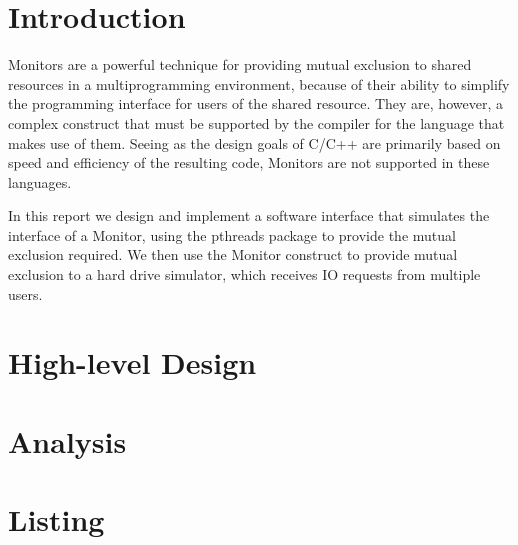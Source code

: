 \documentclass{report}
\begin{document}

\section{Introduction}
Monitors are a powerful technique for providing mutual exclusion to shared
resources in a multiprogramming environment, because of their ability to simplify the
programming interface for users of the shared resource. They are, however, a complex
construct that must be supported by the compiler for the language that makes use of them.
Seeing as the design goals of C/C++ are primarily based on speed and efficiency of the
resulting code, Monitors are not supported in these languages. 

In this report we design and implement a software interface that simulates the interface
of a Monitor, using the pthreads package to provide the mutual exclusion required. We then
use the Monitor construct to provide mutual exclusion to a hard drive simulator, which receives IO requests 
from multiple users.

\section{High-level Design} %

\section{Analysis} %

\section{Listing} %
\end{document}
